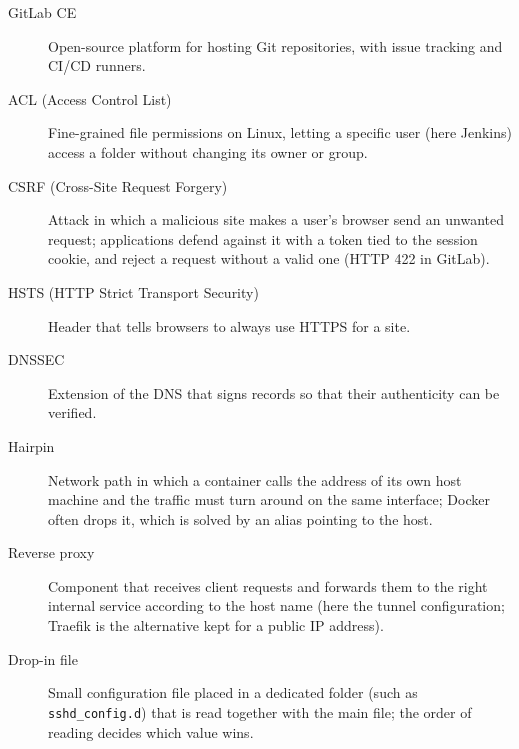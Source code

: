 \begin{description}
  \item[GitLab CE] Open-source platform for hosting Git repositories, with issue tracking and CI/CD runners.
  \item[ACL (Access Control List)] Fine-grained file permissions on Linux, letting a specific user (here Jenkins) access a folder without changing its owner or group.
  \item[CSRF (Cross-Site Request Forgery)] Attack in which a malicious site makes a user's browser send an unwanted request; applications defend against it with a token tied to the session cookie, and reject a request without a valid one (HTTP 422 in GitLab).
  \item[HSTS (HTTP Strict Transport Security)] Header that tells browsers to always use HTTPS for a site.
  \item[DNSSEC] Extension of the DNS that signs records so that their authenticity can be verified.
  \item[Hairpin] Network path in which a container calls the address of its own host machine and the traffic must turn around on the same interface; Docker often drops it, which is solved by an alias pointing to the host.
  \item[Reverse proxy] Component that receives client requests and forwards them to the right internal service according to the host name (here the tunnel configuration; Traefik is the alternative kept for a public IP address).
  \item[Drop-in file] Small configuration file placed in a dedicated folder (such as \texttt{sshd\_config.d}) that is read together with the main file; the order of reading decides which value wins.
\end{description}
